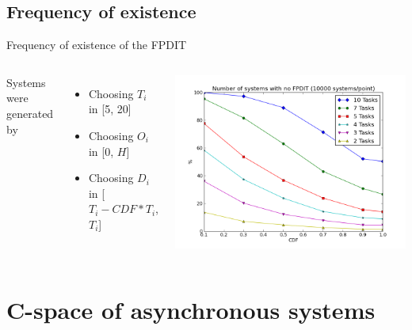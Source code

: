 \documentclass{beamer}
\begin{document}
    \subsection{Frequency of existence}

    \begin{frame}{Frequency of existence of the FPDIT}

    \begin{columns}[c]

        Systems were generated by
        \begin{itemize}
            \item Choosing $T_i$ in [5, 20]
            \item Choosing $O_i$ in [0, $H$]
            \item Choosing $D_i$ in [$T_i - CDF * T_i$, $T_i$]
        \end{itemize}

        \includegraphics[width=1.2\textwidth]{figs/nofpdit_5.png}

    \end{columns}

    \end{frame}

\section{C-space of asynchronous systems}

    \begin{frame}
    \end{frame}
\end{document}
